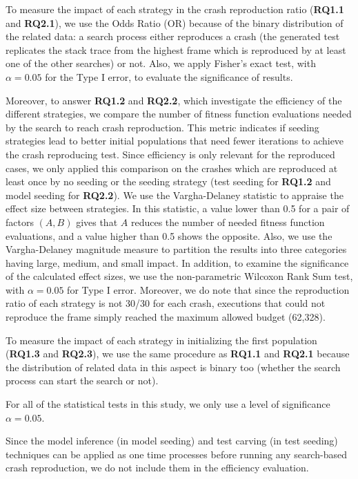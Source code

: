 To measure the impact of each strategy in the crash reproduction ratio (\textbf{RQ1.1} and \textbf{RQ2.1}), we use the Odds Ratio (OR) because of the binary distribution of the related data:  a search process either reproduces a crash (the generated test replicates the stack trace from the highest frame which is reproduced by at least one of the other searches) or not. Also, we apply Fisher's exact test, with $\alpha = 0.05$ for the Type I error, to evaluate the significance of results.

Moreover, to answer \textbf{RQ1.2} and \textbf{RQ2.2}, which investigate the efficiency of the different strategies, we compare the number of fitness function evaluations needed by the search to reach crash reproduction.
This metric indicates if seeding strategies lead to better initial populations that need fewer iterations to achieve the crash reproducing test. Since efficiency is only relevant for the reproduced cases, we only applied this comparison on the crashes which are reproduced at least once by no seeding or the seeding strategy (test seeding for \textbf{RQ1.2} and model seeding for \textbf{RQ2.2}).
 We use the Vargha-Delaney statistic \cite{vargha} to appraise the effect size between strategies. In this statistic, a value lower than 0.5 for a pair of factors $(A,B)$ gives that $A$ reduces the number of needed fitness function evaluations, and a value higher than 0.5 shows the opposite. Also, we use the Vargha-Delaney magnitude measure to partition the results into three categories having large, medium, and small impact. In addition, to examine the significance of the calculated effect sizes, we use the non-parametric Wilcoxon Rank Sum test, with  $\alpha = 0.05$  for Type I error. Moreover, we do note that since the reproduction ratio of each strategy is not 30/30 for each crash, executions that could not reproduce the frame simply reached the maximum allowed budget (62,328).


To measure the impact of each strategy in initializing the first population (\textbf{RQ1.3} and \textbf{RQ2.3}), we use the same procedure as \textbf{RQ1.1} and \textbf{RQ2.1} because the distribution of related data in this aspect is binary too (\ie whether the search process can start the search or not).

For all of the statistical tests in this study, we only use a level of significance $\alpha = 0.05$.

Since the model inference (in model seeding) and test carving (in test seeding) techniques can be applied as one time processes before running any search-based crash reproduction, we do not include them in the efficiency evaluation.

